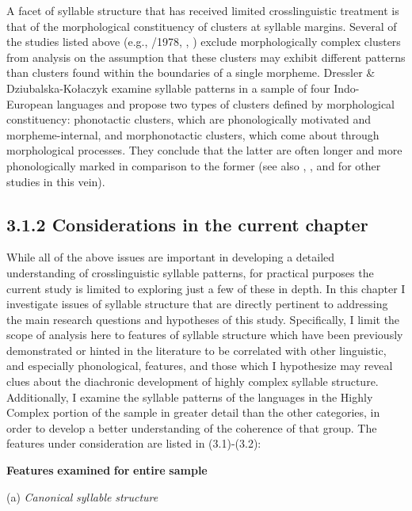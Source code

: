   A facet of syllable structure that has received limited crosslinguistic treatment is that of the morphological constituency of clusters at syllable margins. Several of the studies listed above (e.g., \citealt{Greenberg1965}/1978, \citealt{Morelli1999}, \citealt{Kreitman2008}) exclude morphologically complex clusters from analysis on the assumption that these clusters may exhibit different patterns than clusters found within the boundaries of a single morpheme. Dressler \& Dziubalska-Kołaczyk  examine syllable patterns in a sample of four Indo-European languages and propose two types of clusters defined by morphological constituency: phonotactic clusters, which are phonologically motivated and morpheme-internal, and morphonotactic clusters, which come about through morphological processes. They conclude that the latter are often longer and more phonologically marked in comparison to the former (see also \citealt{DresslerEtAl2010}, \citealt{Orzechowska2012}, and \citealt{DresslerEtAl2015} for other studies in this vein).

\subsection{3.1.2 Considerations in the current chapter}

  While all of the above issues are important in developing a detailed understanding of crosslinguistic syllable patterns, for practical purposes the current study is limited to exploring just a few of these in depth. In this chapter I investigate issues of syllable structure that are directly pertinent to addressing the main research questions and hypotheses of this study. Specifically, I limit the scope of analysis here to features of syllable structure which have been previously demonstrated or hinted in the literature to be correlated with other linguistic, and especially phonological, features, and those which I hypothesize may reveal clues about the diachronic development of highly complex syllable structure. Additionally, I examine the syllable patterns of the languages in the Highly Complex portion of the sample in greater detail than the other categories, in order to develop a better understanding of the coherence of that group. The features under consideration are listed in (3.1)-(3.2):

\ea\label{ex:(3.1)}
   \textbf{Features} \textbf{examined} \textbf{for} \textbf{entire} \textbf{sample}

(a)   \textit{Canonical} \textit{syllable} \textit{structure}

